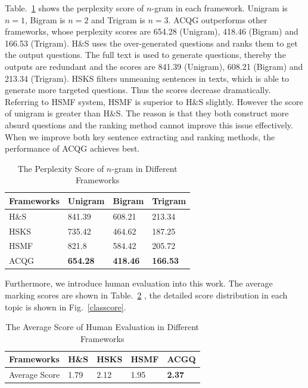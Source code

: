 \documentclass[runningheads,UTF8,article]{comsis2}
\begin{document}
	
	Table.~\ref{perplexity} shows the perplexity score of $ n $-gram in each framework. Unigram is $n=1$, Bigram is $ n=2$ and Trigram is $n=3$. ACQG outperforms other frameworks, whose perplexity scores are 654.28 (Unigram), 418.46 (Bigram) and 166.53 (Trigram). H\&S uses the over-generated questions and ranks them to get the output questions. The full text is used to generate questions, thereby the outputs are redundant and the scores are 841.39 (Unigram), 608.21 (Bigram) and 213.34 (Trigram). HSKS filters unmeaning sentences in texts, which is able to generate more targeted questions. Thus the scores decrease dramatically. Referring to HSMF system, HSMF is superior to H\&S slightly. However the score of unigram is greater than H\&S. The reason is that they both construct more absurd questions and the ranking method cannot improve this issue effectively. When we improve both key sentence extracting and ranking methods, the performance of ACQG achieves best.
	\begin{table}[!ht]
		\centering
		\caption{The Perplexity Score of $n$-gram in Different Frameworks}
		\label{perplexity}
		\setlength\tabcolsep{0.5em}
		\begin{tabular}{|p{50pt}|p{50pt}p{50pt}p{50pt}|}
			\hline
			Frameworks& Unigram & Bigram & Trigram \\
			\hline
			H\&S & 841.39 & 608.21 & 213.34\\
			HSKS & 735.42 & 464.62 & 187.25 \\
			HSMF& 821.8 & 584.42 & 205.72 \\
			ACQG & \textbf{654.28} & \textbf{418.46} & \textbf{166.53} \\
			\hline
		\end{tabular}
	\end{table}
	
	
	Furthermore, we introduce human evaluation into this work. The average marking scores are shown in Table.~\ref{averagescre} , the detailed score distribution in each topic is shown in Fig.~\ref{classcore}. 
	
	
	\begin{table}[!ht]
		\centering
		\caption{The Average Score of Human Evaluation in Different Frameworks}
		\label{averagescre}
		\setlength\tabcolsep{0.5em}
		\begin{tabular}{|p{80pt}|p{40pt}p{40pt}p{40pt}p{40pt}|}
			\hline
			Frameworks  & H\&S & HSKS & HSMF & ACGQ \\
			\hline
			Average Score & 1.79 & 2.12 & 1.95 &\textbf{2.37}\\
			\hline
		\end{tabular}
	\end{table}
	
\end{document}
